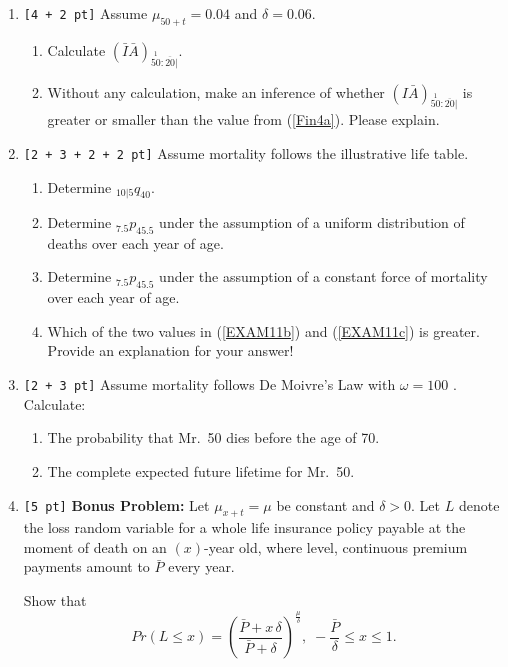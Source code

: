 \documentclass[11pt,fleqn,oneside]{book}
\begin{document}
\begin{enumerate}
\newpage

\item  {\tt [4 + 2 pt]} Assume $\mu_{50+t}=0.04$ and $\delta=0.06$. 
\begin{enumerate}
\item \label{Fin4a} Calculate $\left(\bar{I}\bar{A}\right)_{\stackrel{1}{50}:\overline{20}|}$.
\item Without any calculation, make an inference of whether $\left(I\bar{A}\right)_{\stackrel{1}{50}:\overline{20}|}$ is greater or smaller than the value from (\ref{Fin4a}). Please explain.
\end{enumerate}

\newpage

\item {\tt [2 + 3 + 2 + 2 pt]} Assume mortality follows the illustrative life table.
\begin{enumerate}
\item Determine $_{10|5}q_{40}$.
\item \label{EXAM11b} Determine ${_{7.5}p_{45.5}}$ under the assumption of a uniform distribution of deaths over each year of age.
\item \label{EXAM11c} Determine ${_{7.5}p_{45.5}}$ under the assumption of a constant force of mortality over each year of age.
\item Which of the two values in (\ref{EXAM11b}) and (\ref{EXAM11c}) is greater. Provide an explanation for your answer!
\end{enumerate}

\newpage

\item {\tt [2 + 3 pt]} Assume mortality follows De Moivre's Law with $\omega = 100$ . Calculate:
\begin{enumerate}
\item The probability that Mr.\ 50 dies before the age of 70.
\item The complete expected future lifetime for Mr.\ 50.
\end{enumerate}


\newpage

\item {\tt [5 pt]} \textbf{Bonus Problem:} Let $\mu_{x+t} = \mu$ be constant and $\delta>0$. Let $L$ denote the loss random variable for a whole life insurance policy payable at the moment of death on an $(x)$-year old, where level, continuous premium payments amount to $\bar{P}$ every year.

Show that 
$$
Pr(L \leq x) = \left(\frac{\bar{P} + x\,\delta}{\bar{P} + \delta}\right)^{\frac{\mu}{\delta}},\;
-\frac{\bar{P}}{\delta} \leq x \leq 1.
$$ \end{enumerate}
\end{document}
